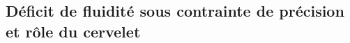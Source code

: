 %
%
%
%
%
%
%



\subsection{Déficit de fluidité sous contrainte de précision et rôle du cervelet}

%


